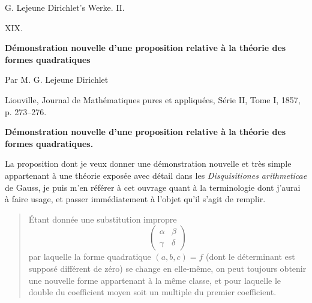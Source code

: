 \documentclass[11pt]{article}
\begin{document}
\begin{center}
{\Large G. Lejeune Dirichlet's Werke. II.}\par\vspace{1.2em}
{\Large XIX.}\par\vspace{0.5em}
{\LARGE \textbf{Démonstration nouvelle d'une proposition relative à la théorie des formes quadratiques}}\par\vspace{1em}
{\large Par M. G. Lejeune Dirichlet}\par\vspace{0.5em}
{\small Liouville, Journal de Mathématiques pures et appliquées, Série II, Tome I, 1857, p. 273--276.}
\end{center}

\bigskip
\begin{center}
{\large \textbf{Démonstration nouvelle d'une proposition relative à la théorie des formes quadratiques.}}
\end{center}

La proposition dont je veux donner une démonstration nouvelle et très simple appartenant à une théorie exposée avec détail dans les \emph{Disquisitiones arithmeticae} de Gauss, je puis m'en référer à cet ouvrage quant à la terminologie dont j'aurai à faire usage, et passer immédiatement à l'objet qu'il s'agit de remplir.

\begin{quote}
Étant donnée une substitution impropre
\[
\begin{pmatrix}\alpha&\beta\\ \gamma&\delta\end{pmatrix}
\]
par laquelle la forme quadratique \((a,b,c)=f\) (dont le déterminant est supposé différent de zéro) se change en elle-même, on peut toujours obtenir une nouvelle forme appartenant à la même classe, et pour laquelle le double du coefficient moyen soit un multiple du premier coefficient.
\end{quote}
\end{document}

